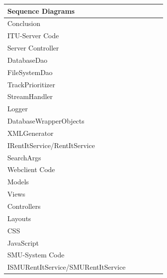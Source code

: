 \documentclass[a4paper,11pt,report]{article}
\begin{document}
\begin{figure}[htp]
\begin{tabular}{| l | l | l | l | l | l |}
  \hline
  Sequence Diagrams &  & \cellcolor{Gray} &  &  &  \\
  \hline
  Conclusion & \cellcolor{Gray} & \cellcolor{Gray} & \cellcolor{Gray} & \cellcolor{Gray} & \cellcolor{Gray} \\
  \hline
  \multicolumn{6}{|l|}{ITU-Server Code} \\
  \hline
  Server Controller & \cellcolor{Gray} & \cellcolor{Gray} & \cellcolor{Gray} & \cellcolor{Gray} & \cellcolor{Gray} \\
  \hline
  DatabaseDao & \cellcolor{Gray} & \cellcolor{Gray} &  & \cellcolor{Gray} & \cellcolor{Gray}  \\
  \hline
  FileSystemDao & \cellcolor{Gray} & \cellcolor{Gray} &  & \cellcolor{Gray} &  \\
  \hline
  TrackPrioritizer &  & \cellcolor{Gray} &  &  &  \\
  \hline
  StreamHandler & \cellcolor{Gray} & \cellcolor{Gray} &  &  &  \\
  \hline
  Logger & \cellcolor{Gray} &  &  & \cellcolor{Gray} &  \\
  \hline
  DatabaseWrapperObjects &  &  &  & \cellcolor{Gray} & \cellcolor{Gray} \\
  \hline
  XMLGenerator & \cellcolor{Gray} &  &  &  &  \\
  \hline
  IRentItService/RentItService & \cellcolor{Gray} &  & \cellcolor{Gray} & \cellcolor{Gray} & \cellcolor{Gray} \\
  \hline
  SearchArgs & \cellcolor{Gray} &  &  & \cellcolor{Gray} & \cellcolor{Gray} \\
  \hline
  \multicolumn{6}{|l|}{Webclient Code} \\
  \hline
  Models & \cellcolor{Gray} &  & \cellcolor{Gray} &  & \cellcolor{Gray} \\
  \hline
  Views & \cellcolor{Gray} &  & \cellcolor{Gray} &  & \cellcolor{Gray} \\
  \hline
  Controllers & \cellcolor{Gray} &  & \cellcolor{Gray} &  & \cellcolor{Gray} \\
  \hline
  Layouts & \cellcolor{Gray} &  & \cellcolor{Gray} &  & \cellcolor{Gray} \\
  \hline
  CSS & &  & \cellcolor{Gray} &  & \cellcolor{Gray} \\
  \hline
  JavaScript &  &  &  &  & \cellcolor{Gray} \\
  \hline
  \multicolumn{6}{|l|}{SMU-System Code} \\
  \hline
  ISMURentItService/SMURentItService & \cellcolor{Gray} & \cellcolor{Gray} & \cellcolor{Gray} & \cellcolor{Gray} & \cellcolor{Gray} \\

\end{tabular}
\end{figure}
\end{document}
